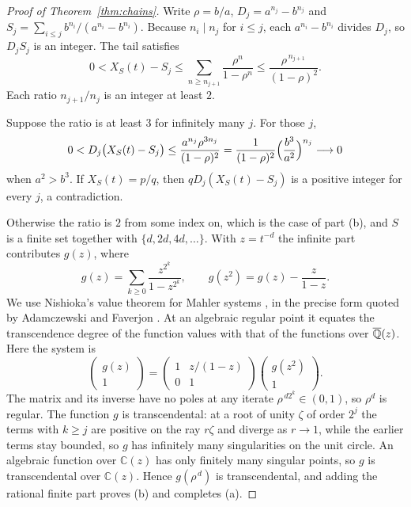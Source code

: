 \documentclass[11pt]{article}
\begin{document}
\begin{proof}[Proof of Theorem~\ref{thm:chains}]
Write $\rho=b/a$, $D_j=a^{n_j}-b^{n_j}$ and
$S_j=\sum_{i\le j}b^{n_i}/(a^{n_i}-b^{n_i})$.  Because $n_i\mid n_j$ for
$i\le j$, each $a^{n_i}-b^{n_i}$ divides $D_j$, so $D_jS_j$ is an integer.  The
tail satisfies
\[
 0<X_S(t)-S_j\le\sum_{n\ge n_{j+1}}\frac{\rho^n}{1-\rho^n}
 \le\frac{\rho^{\,n_{j+1}}}{(1-\rho)^2}.
\]
Each ratio $n_{j+1}/n_j$ is an integer at least $2$.

Suppose the ratio is at least $3$ for infinitely many $j$.  For those $j$,
\[
 0<D_j\bigl(X_S(t)-S_j\bigr)\le\frac{a^{n_j}\rho^{3n_j}}{(1-\rho)^2}
 =\frac{1}{(1-\rho)^2}\Bigl(\frac{b^3}{a^2}\Bigr)^{n_j}\longrightarrow0
\]
when $a^2>b^3$.  If $X_S(t)=p/q$, then $qD_j(X_S(t)-S_j)$ is a positive
integer for every $j$, a contradiction.

Otherwise the ratio is $2$ from some index on, which is the case of part (b),
and $S$ is a finite set together with $\{d,2d,4d,\dots\}$.  With $z=t^{-d}$ the
infinite part contributes $g(z)$, where
\[
 g(z)=\sum_{k\ge0}\frac{z^{2^k}}{1-z^{2^k}},\qquad
 g(z^2)=g(z)-\frac{z}{1-z}.
\]
We use Nishioka's value theorem for Mahler systems
\cite{nishioka1996}, in the precise form quoted by Adamczewski and Faverjon
\cite[Theorem~1.1, p.~3]{adamczewskifaverjon2016}.  At an algebraic regular
point it equates the transcendence degree of the function values with that
of the functions over $\overline{\mathbb{Q}}(z)$.  Here the system is
\[
 \begin{pmatrix}g(z)\\1\end{pmatrix}
 =\begin{pmatrix}1&z/(1-z)\\0&1\end{pmatrix}
  \begin{pmatrix}g(z^2)\\1\end{pmatrix}.
\]
The matrix and its inverse have no poles at any iterate
$\rho^{\,d2^k}\in(0,1)$, so $\rho^d$ is regular.
The function $g$ is transcendental: at a root of unity
$\zeta$ of order $2^j$ the terms with $k\ge j$ are positive on the ray
$r\zeta$ and diverge as $r\to1$, while the earlier terms stay bounded, so $g$
has infinitely many singularities on the unit circle.  An algebraic function
over $\mathbb{C}(z)$ has only finitely many singular points, so $g$ is
transcendental over $\mathbb{C}(z)$.  Hence $g(\rho^{\,d})$ is
transcendental, and adding the rational finite part proves (b) and completes
(a).
\end{proof}
\end{document}
